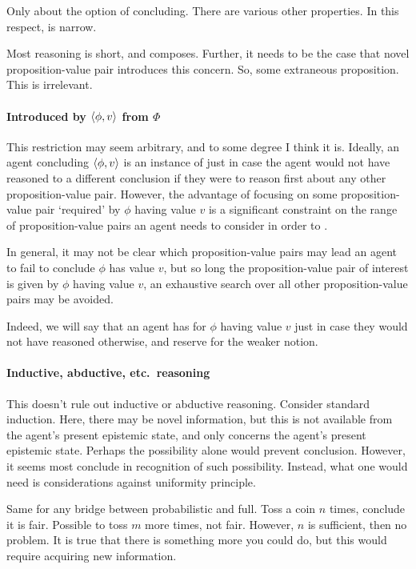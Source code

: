 \begin{note}
  Only about the option of concluding.
  There are various other properties.
  In this respect, \qzs{} is narrow.
\end{note}

\begin{note}
  Most reasoning is short, and composes.
  Further, it needs to be the case that novel proposition-value pair introduces this concern.
  So, some extraneous proposition.
  This is irrelevant.
\end{note}

\paragraph*{Introduced by \(\langle \phi, v \rangle\) from \(\Phi\)}

\begin{note}
  This restriction may seem arbitrary, and to some degree I think it is.
  Ideally, an agent concluding \(\langle \phi, v \rangle\) is an instance of \csN{} just in case the agent would not have reasoned to a different conclusion if they were to reason first about any other proposition-value pair.
  However, the advantage of focusing on some proposition-value pair `required' by \(\phi\) having value \(v\) is a significant constraint on the range of proposition-value pairs an agent needs to consider in order to \csN{}.

  In general, it may not be clear which proposition-value pairs may lead an agent to fail to conclude \(\phi\) has value \(v\), but so long the proposition-value pair of interest is given by \(\phi\) having value \(v\), an exhaustive search over all other proposition-value pairs may be avoided.

  Indeed, we will say that an agent has \emph{\support{}} for \(\phi\) having value \(v\) just in case they would not have reasoned otherwise, and reserve \emph{\claiming{}} \support{} for the weaker notion.
\end{note}

\paragraph*{Inductive, abductive, etc.\ reasoning}

\begin{note}
  This doesn't rule out inductive or abductive reasoning.
  Consider standard induction.
  Here, there may be novel information, but this is not available from the agent's present epistemic state, and \qzs{} only concerns the agent's present epistemic state.
  Perhaps the possibility alone would prevent conclusion.
  However, it seems most conclude in recognition of such possibility.
  Instead, what one would need is considerations against uniformity principle.

  Same for any bridge between probabilistic and full.
  Toss a coin \(n\) times, conclude it is fair.
  Possible to toss \(m\) more times, not fair.
  However, \(n\) is sufficient, then no problem.
  It is true that there is something more you could do, but this would require acquiring new information.
\end{note}

